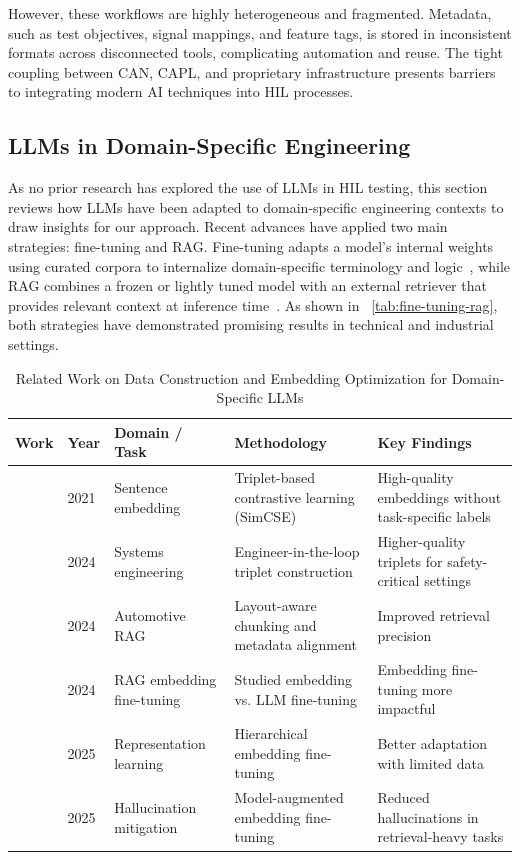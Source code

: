 \documentclass[a4paper,fleqn]{cas-dc}
\begin{document}
However, these workflows are highly heterogeneous and fragmented. Metadata, such as test objectives, signal mappings, and feature tags, is stored in inconsistent formats across disconnected tools, complicating automation and reuse. The tight coupling between CAN, CAPL, and proprietary infrastructure presents barriers to integrating modern AI techniques into HIL processes.

\subsection{LLMs in Domain-Specific Engineering}
As no prior research has explored the use of LLMs in HIL testing, this section reviews how LLMs have been adapted to domain-specific engineering contexts to draw insights for our approach. Recent advances have applied two main strategies: fine-tuning and RAG. Fine-tuning adapts a model’s internal weights using curated corpora to internalize domain-specific terminology and logic~\cite{elhambakhsh2025domain, lu2025fine}, while RAG combines a frozen or lightly tuned model with an external retriever that provides relevant context at inference time~\cite{ZHANG2023110264, hu2024rag}. As shown in \tablename~\ref{tab:fine-tuning-rag}, both strategies have demonstrated promising results in technical and industrial settings.

\begin{table}[h]
\centering
\caption{Related Work on Data Construction and Embedding Optimization for Domain-Specific LLMs}
\label{tab:data-embedding}
\footnotesize
\begin{tabularx}{\textwidth}{l l l X X}
\toprule
\textbf{Work} & \textbf{Year} & \textbf{Domain / Task} & \textbf{Methodology} & \textbf{Key Findings} \\
\midrule
\cite{gao2021simcse}  & 2021 & Sentence embedding & Triplet-based contrastive learning (SimCSE) & High-quality embeddings without task-specific labels \\
\cite{yang2024rethinking}  & 2024 & Systems engineering & Engineer-in-the-loop triplet construction & Higher-quality triplets for safety-critical settings \\
\cite{liu2024optimizing}  & 2024 & Automotive RAG & Layout-aware chunking and metadata alignment & Improved retrieval precision \\
\cite{nguyen2024enhancing}  & 2024 & RAG embedding fine-tuning & Studied embedding vs. LLM fine-tuning & Embedding fine-tuning more impactful \\
\cite{zhou2025representation}  & 2025 & Representation learning & Hierarchical embedding fine-tuning & Better adaptation with limited data \\
\cite{zhang2025hallucination}  & 2025 & Hallucination mitigation & Model-augmented embedding fine-tuning & Reduced hallucinations in retrieval-heavy tasks \\
\bottomrule
\end{tabularx}
\end{table}
\end{document}
